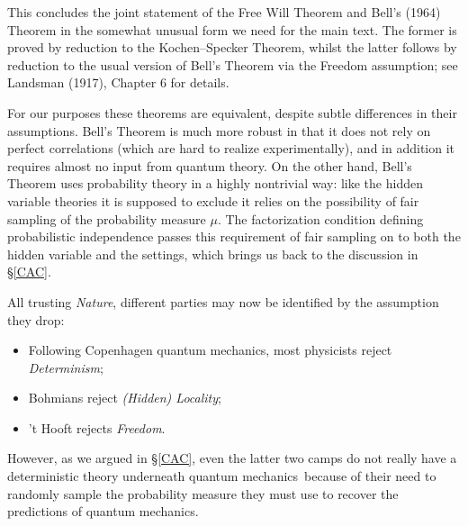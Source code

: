 \documentclass[12pt]{article}
\numberwithin{equation}{section}
\newcommand{\qm}{quantum mechanics}
\begin{document}
This concludes the joint statement of the Free Will Theorem and Bell's (1964) Theorem in the somewhat unusual form we need for the main text. The former is proved by reduction to the Kochen--Specker Theorem, whilst the latter follows by reduction to the usual version of Bell's Theorem via the Freedom assumption; see Landsman (1917), Chapter 6 for details. 

For our purposes these theorems are equivalent, despite subtle differences in their assumptions. Bell's Theorem is much more robust in that it does not rely on perfect correlations (which are hard to realize experimentally), and in addition it requires almost no input from quantum theory.
On the other hand,  Bell's Theorem uses  probability theory in a highly nontrivial way: like the hidden variable theories it is supposed to exclude it relies on the possibility of fair sampling of the probability measure $\mu$. The 
  factorization condition defining probabilistic independence passes this requirement of fair sampling on to both the hidden variable and the settings, which brings us back to the discussion in \S\ref{CAC}. 
 \smallskip
 
 \noindent All trusting \emph{Nature},  different parties may now be identified by the assumption they drop:
 \begin{itemize}
\item Following Copenhagen \qm, most physicists reject \emph{Determinism};
\item Bohmians reject  \emph{(Hidden) Locality};
\item 't Hooft rejects  \emph{Freedom}. 
\end{itemize}
However, as we argued in \S\ref{CAC}, even the latter two camps do not really have a deterministic theory underneath \qm\ because of their need to randomly sample the probability measure they must use to recover the predictions of \qm. 

  \newpage
{}

\raggedright
\end{document}

